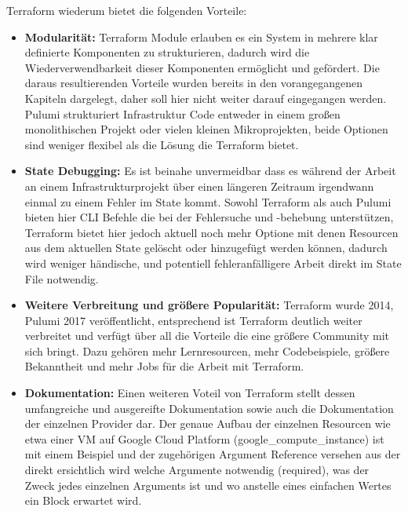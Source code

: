 Terraform wiederum bietet die folgenden Vorteile:

\begin{itemize}
  \item \textbf{Modularität:} Terraform Module erlauben es ein System in
  mehrere klar definierte Komponenten zu strukturieren, dadurch wird die
  Wiederverwendbarkeit dieser Komponenten ermöglicht und gefördert.
  Die daraus resultierenden Vorteile wurden bereits in den vorangegangenen
  Kapiteln dargelegt, daher soll hier nicht weiter darauf eingegangen werden.
  Pulumi strukturiert Infrastruktur Code entweder in einem großen
  monolithischen Projekt oder vielen kleinen Mikroprojekten, beide
  Optionen sind weniger flexibel als die Lösung die Terraform bietet.

  \item \textbf{State Debugging:} Es ist beinahe unvermeidbar
  dass es während der Arbeit an einem Infrastrukturprojekt über einen
  längeren Zeitraum irgendwann einmal zu einem Fehler im State kommt.
  Sowohl Terraform als auch Pulumi bieten hier CLI Befehle die bei der
  Fehlersuche und -behebung unterstützen, Terraform bietet hier jedoch
  aktuell noch mehr Optione mit denen Resourcen aus dem aktuellen State
  gelöscht oder hinzugefügt werden können, dadurch wird weniger händische,
  und potentiell fehleranfälligere Arbeit direkt im State File notwendig.

  \item \textbf{Weitere Verbreitung und größere Popularität:} Terraform wurde
  2014, Pulumi 2017 veröffentlicht, entsprechend ist Terraform deutlich weiter
  verbreitet und verfügt über all die Vorteile die eine größere Community mit
  sich bringt. Dazu gehören mehr Lernresourcen, mehr Codebeispiele, größere
  Bekanntheit und mehr Jobs für die Arbeit mit Terraform.

  \item \textbf{Dokumentation:} Einen weiteren Voteil von Terraform stellt
  dessen umfangreiche und ausgereifte Dokumentation sowie auch die
  Dokumentation der einzelnen Provider dar. Der genaue Aufbau der einzelnen
  Resourcen wie etwa einer VM auf Google Cloud Platform
  (google\_compute\_instance) ist mit einem Beispiel und der zugehörigen
  Argument Reference versehen aus der direkt ersichtlich wird welche
  Argumente notwendig (required), was der Zweck jedes einzelnen Arguments ist
  und wo anstelle eines einfachen Wertes ein Block erwartet wird.

\end{itemize}

